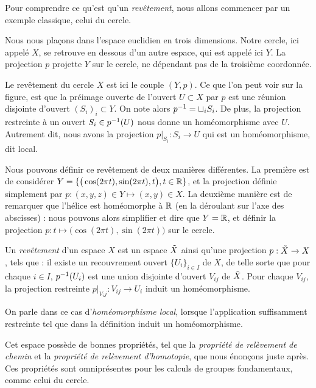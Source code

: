 Pour comprendre ce qu'est qu'un \emph{revêtement}, nous allons commencer par un exemple classique, celui du cercle.

\begin{exemple}
Nous nous plaçons dans l'espace euclidien en trois dimensions. Notre cercle, ici appelé $X$, se retrouve en dessous d'un autre espace, qui est appelé ici $Y$. La projection $p$ projette $Y$ sur le cercle, ne dépendant pas de la troisième coordonnée.

Le revêtement du cercle $X$ est ici le couple $(Y,p)$. Ce que l'on peut voir sur la figure, est que la préimage ouverte de l'ouvert $U\subset X$ par $p$ est une réunion disjointe d'ouvert $(S_i)_i\subset Y$. On note alors $p^{-1}=\sqcup_i S_i$. De plus, la projection restreinte à un ouvert $S_i\in p^{-1}(U)$ nous donne un homéomorphisme avec $U$. Autrement dit, nous avons la projection $p|_{S_i}:S_i\to U$ qui est un homéomorphisme, dit local.

Nous pouvons définir ce revêtement de deux manières différentes. La première est de considérer $Y=\{\big(\cos(2\pi t),\sin(2\pi t), t\big),t\in \mathbb{R}\}$, et la projection définie simplement par $p:(x,y,z)\in Y\mapsto(x,y)\in X$. La deuxième manière est de remarquer que l'hélice est homéomorphe à $\mathbb{R}$ (en la déroulant sur l'axe des abscisses) : nous pouvons alors simplifier et dire que $Y=\mathbb{R}$, et définir la projection $p:t\mapsto\big(\cos(2\pi t),\sin(2\pi t)\big)$ sur le cercle.
\end{exemple}

\begin{definition}
Un \emph{revêtement} d'un espace $X$ est un espace $\Tilde{X}$ ainsi qu'une projection $p:\Tilde{X}\to X$, tels que : il existe un recouvrement ouvert $\{U_i\}_{i\in I}$ de $X$, de telle sorte que pour chaque $i\in I$,  $p^{-1}(U_i)$ est une union disjointe d'ouvert $V_{ij}$ de $\Tilde{X}$. Pour chaque $V_{ij}$, la projection restreinte $p|_{V_ij}:V_{ij}\to U_i$ induit un homéomorphisme.
\end{definition}

On parle dans ce cas d'\emph{homéomorphisme local}, lorsque l'application suffisamment restreinte tel que dans la définition induit un homéomorphisme.

\bigskip Cet espace possède de bonnes propriétés, tel que la \emph{propriété de relèvement de chemin} et la \emph{propriété de relèvement d'homotopie}, que nous énonçons juste après. Ces propriétés sont omniprésentes pour les calculs de groupes fondamentaux, comme celui du cercle.


